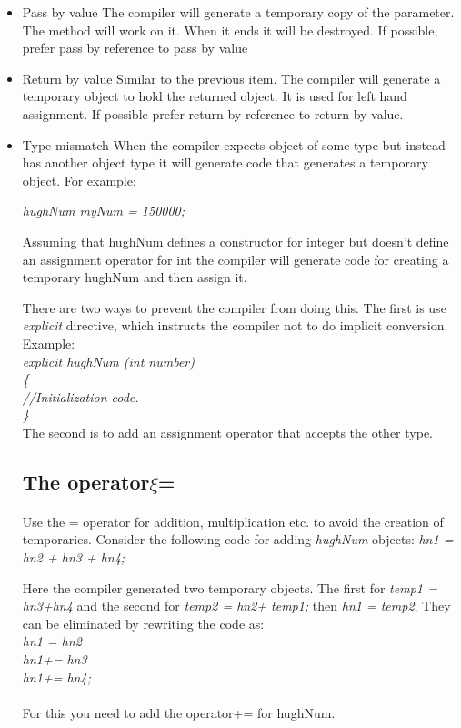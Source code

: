 \documentclass{article}
\begin{document}
 \begin{itemize}
  \item{Pass by value}
  The compiler will generate a temporary copy of the parameter. 
  The method will work on it. When it ends it will be destroyed.
  If possible, prefer pass by reference to pass by value

  \item{Return by value}
  Similar to the previous item. 
  The compiler will generate a temporary object to hold the returned object. 
  It is used for left hand assignment.
  If possible prefer return by reference to return by value.

  \item{Type mismatch}
  When the compiler expects object of some type but instead has another object type it will
  generate code that generates a temporary object. For example:
  
  \emph{
  hughNum myNum = 150000;
  }

  Assuming that hughNum defines a constructor for integer but doesn't define an assignment operator for int the compiler will generate code for creating a temporary hughNum and then assign it.

  There are two ways to prevent the compiler from doing this. The first is use \emph{explicit} directive, which instructs the compiler not to do implicit conversion. Example:\\
  \emph{
      explicit hughNum (int number) \\
   \{\\
   //Initialization code.\\
  \}
  }\\

 The second is to add an assignment operator that accepts the other type.

 \subsection{The operator$\xi$=}
 \paragraph{}
 Use the = operator for addition, multiplication etc. to avoid the creation of temporaries.
 Consider the following code for adding \emph{hughNum} objects:
 \emph{
 hn1 = hn2 + hn3 + hn4;
 }

 Here the compiler generated two temporary objects. The first for \emph{temp1 = hn3+hn4} and the second for \emph{temp2 = hn2+ temp1;} then \emph{hn1 = temp2};
 They can be eliminated by rewriting the code as:\\
 
 \emph{
 hn1 = hn2\\
 hn1+=  hn3\\
 hn1+=  hn4;\\
 }\\
 For this you need to add the operator+= for hughNum.
 
 \end{itemize}
\end{document}
